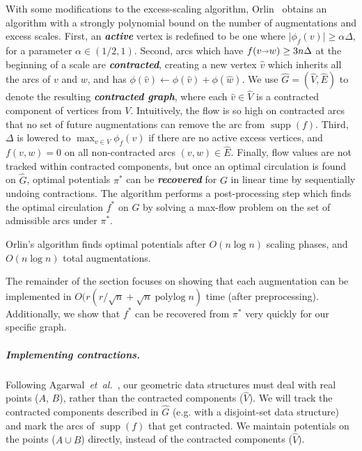 \documentclass[a4paper,UKenglish]{socg-lipics-v2018}
\def\etal{\emph{et~al.}}
\def\etal{\textit{et~al.}}
\def\polylog{\mathop{\mathrm{polylog}}}
\def\abs#1{\mathopen| #1 \mathclose|}		%
\def\fsupply{\phi}
\def\arcto{\mathord\shortrightarrow}
\def\arc#1#2{#1\arcto#2}
\def\supp{\operatorname{supp}}
\theoremstyle{plain}
\numberwithin{figure}{section}
\renewcommand{\paragraph}{\subparagraph}
\def\EMPH#1{\textbf{\emph{\boldmath #1}}}
\begin{document}
With some modifications to the excess-scaling algorithm, Orlin~\cite{O93}
obtains an algorithm with a strongly polynomial bound on the number of
augmentations and excess scales.
First, an \EMPH{active} vertex is redefined to be one where
$\abs{\fsupply_f(v)} \geq \alpha\Delta$, for a parameter $\alpha \in (1/2, 1)$.
Second, arcs which have $f(\arc vw) \geq 3n\Delta$ at the beginning of a scale
are \EMPH{contracted}, creating a new vertex $\hat{v}$ which inherits all the
arcs of $v$ and $w$, and has
$\fsupply(\hat{v}) \gets \fsupply(\hat{v}) + \fsupply(\hat{w})$.
We use $\hat{G} = (\hat{V}, \hat{E})$ to denote the resulting
\EMPH{contracted graph}, where each $\hat{v} \in \hat{V}$ is a contracted
component of vertices from $V$.
Intuitively, the flow is so high on contracted arcs that no set of future
augmentations can remove the arc from $\supp(f)$.
Third, $\Delta$ is lowered to $\max_{v \in V} \fsupply_f(v)$ if there are no
active excess vertices, and $f(v, w) = 0$ on all non-contracted arcs
$(v, w) \in \hat{E}$.
Finally, flow values are not tracked within contracted components, but once an
optimal circulation is found on $\hat{G}$, optimal potentials $\pi^*$ can be
\EMPH{recovered} for $G$ in linear time by sequentially undoing contractions.
The algorithm performs a post-processing step which finds the optimal
circulation $f^*$ on $G$ by solving a max-flow problem on the set of admissible
arcs under $\pi^*$.

\begin{theorem}
\label{theorem:orlin_old}
Orlin's algorithm finds optimal potentials after $O(n\log n)$ scaling phases,
and $O(n\log n)$ total augmentations.
\end{theorem}

The remainder of the section focuses on showing that each augmentation can be
implemented in $O(r(r/\sqrt{n} + \sqrt{n}\polylog n)$ time (after
preprocessing).
Additionally, we show that $f^*$ can be recovered from $\pi^*$ very quickly
for our specific graph.

\paragraph{Implementing contractions.}
Following Agarwal~\etal~\cite{AFPVX17}, our geometric data structures must deal
with real points ($A$, $B$), rather than the contracted components ($\hat{V}$).
We will track the contracted components described in $\hat{G}$ (e.g. with a
disjoint-set data structure) and mark the arcs of $\supp(f)$ that get
contracted.
We maintain potentials on the points ($A \cup B$) directly, instead of the
contracted components ($\hat{V}$).
\end{document}
